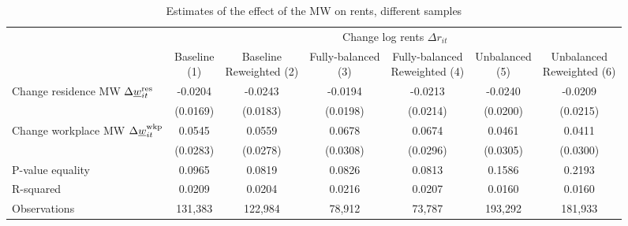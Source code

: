 \begin{landscape}
\begin{table}[hbt!]
    \centering
    \caption{Estimates of the effect of the MW on rents, different samples}
    \label{tab:static_sample}

    \begin{tabular}{@{}lcccccc@{}}
        \toprule
                                             & \multicolumn{6}{c}{Change log rents $\Delta r_{it}$}                   \\ \cmidrule(l){2-7} 
                                             & \shortstack{Baseline\\(1)}       & \shortstack{Baseline\\Reweighted (2)}
                                             & \shortstack{Fully-balanced\\(3)} & \shortstack{Fully-balanced\\Reweighted (4)}  
                                             & \shortstack{Unbalanced\\(5)}     & \shortstack{Unbalanced\\Reweighted (6)}  \\ \midrule
        Change residence MW 
                  $\Delta\underline{w}_{it}^{\text{res}}$    & -0.0204      & -0.0243        & -0.0194       & -0.0213    & -0.0240       & -0.0209     \\
                                             & (0.0169)    & (0.0183)      & (0.0198)     & (0.0214)  & (0.0200)     & (0.0215)   \\
        Change workplace MW 
                   $\Delta\underline{w}_{it}^{\text{wkp}}$   & 0.0545      & 0.0559        & 0.0678       & 0.0674    & 0.0461       & 0.0411     \\
                                             & (0.0283)    & (0.0278)      & (0.0308)     & (0.0296)  & (0.0305)     & (0.0300)   \\ \midrule
        P-value equality                     & 0.0965      & 0.0819        & 0.0826       & 0.0813    & 0.1586       & 0.2193     \\
        R-squared                            & 0.0209      & 0.0204        & 0.0216       & 0.0207    & 0.0160       & 0.0160     \\
        Observations                         & 131,383     & 122,984       & 78,912      & 73,787   & 193,292      & 181,933    \\ \bottomrule
    \end{tabular}


\end{table}
\end{landscape}
